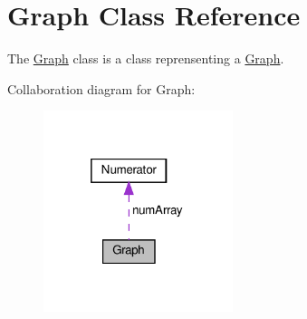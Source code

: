 \hypertarget{classGraph}{}\section{Graph Class Reference}
\label{classGraph}


The \hyperlink{classGraph}{Graph} class is a class reprensenting a \hyperlink{classGraph}{Graph}.  




Collaboration diagram for Graph\+:\nopagebreak
\begin{figure}[H]
\begin{center}
\leavevmode
\includegraphics[width=157pt]{classGraph__coll__graph}
\end{center}
\end{figure}
